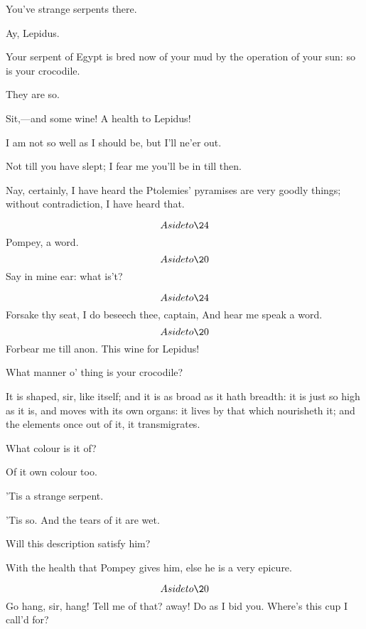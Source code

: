 \documentclass{book}
\begin{document}
	You've strange serpents there.

\1	Ay, Lepidus.

\begin{PROSE}

	Your serpent of Egypt is bred now of your mud by the
	operation of your sun: so is your crocodile.

\1	They are so.

	Sit,---and some wine! A health to Lepidus!

	I am not so well as I should be, but I'll ne'er out.

	Not till you have slept; I fear me you'll be in till then.

	Nay, certainly, I have heard the Ptolemies'
	pyramises are very goodly things; without
	contradiction, I have heard that.

\end{PROSE}

	\[Aside to \24\]  Pompey, a word. \\

	\[Aside to \20\]   Say in mine ear: 	what is't?

	\[Aside to \24\]  Forsake thy seat, I do beseech thee, captain,
	And hear me speak a word. \\


	\[Aside to \20\]  Forbear me till anon.
	This wine for Lepidus!

\begin{PROSE}

	What manner o' thing is your crocodile?

\1	It is shaped, sir, like itself; and it is as broad
	as it hath breadth: it is just so high as it is,
	and moves with its own organs: it lives by that
	which nourisheth it; and the elements once out of
	it, it transmigrates.

	What colour is it of?

\1	Of it own colour too.

	'Tis a strange serpent.

\1	'Tis so. And the tears of it are wet.

\3	Will this description satisfy him?

\1	With the health that Pompey gives him, else he is a
	very epicure.

\end{PROSE}

	\[Aside to \20\]  Go hang, sir, hang! Tell me of that? away!
	Do as I bid you. Where's this cup I call'd for?
\end{document}
